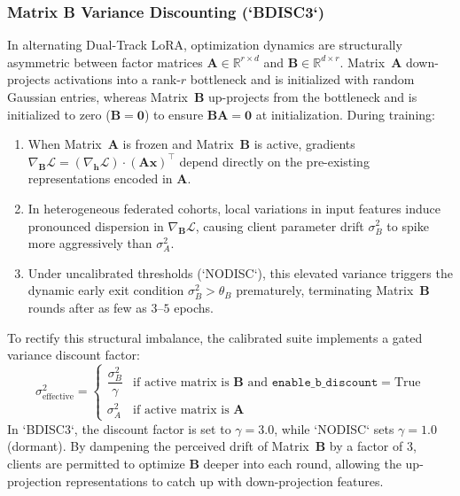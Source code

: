 \documentclass[10pt,a4paper]{article}
\begin{document}
\subsubsection{Matrix B Variance Discounting (`BDISC3`)}
In alternating Dual-Track LoRA, optimization dynamics are structurally asymmetric between factor matrices $\mathbf{A} \in \mathbb{R}^{r \times d}$ and $\mathbf{B} \in \mathbb{R}^{d \times r}$.
Matrix~$\mathbf{A}$ down-projects activations into a rank-$r$ bottleneck and is initialized with random Gaussian entries, whereas Matrix~$\mathbf{B}$ up-projects from the bottleneck and is initialized to zero ($\mathbf{B} = \mathbf{0}$) to ensure $\mathbf{B}\mathbf{A} = \mathbf{0}$ at initialization.
During training:
\begin{enumerate}
    \item When Matrix~$\mathbf{A}$ is frozen and Matrix~$\mathbf{B}$ is active, gradients $\nabla_\mathbf{B} \mathcal{L} = (\nabla_\mathbf{h} \mathcal{L}) \cdot (\mathbf{A}\mathbf{x})^\top$ depend directly on the pre-existing representations encoded in $\mathbf{A}$.
    \item In heterogeneous federated cohorts, local variations in input features induce pronounced dispersion in $\nabla_\mathbf{B} \mathcal{L}$, causing client parameter drift $\sigma^2_B$ to spike more aggressively than $\sigma^2_A$.
    \item Under uncalibrated thresholds (`NODISC`), this elevated variance triggers the dynamic early exit condition $\sigma^2_B > \theta_B$ prematurely, terminating Matrix~$\mathbf{B}$ rounds after as few as $3$--$5$ epochs.
\end{enumerate}
To rectify this structural imbalance, the calibrated suite implements a gated variance discount factor:
\begin{equation}
\sigma^2_{\text{effective}} = 
\begin{cases}
\dfrac{\sigma^2_B}{\gamma} & \text{if active matrix is } \mathbf{B} \text{ and } \texttt{enable\_b\_discount} = \text{True} \\[0.8em]
\sigma^2_A & \text{if active matrix is } \mathbf{A}
\end{cases}
\end{equation}
In `BDISC3`, the discount factor is set to $\gamma = 3.0$, while `NODISC` sets $\gamma = 1.0$ (dormant).
By dampening the perceived drift of Matrix~$\mathbf{B}$ by a factor of 3, clients are permitted to optimize $\mathbf{B}$ deeper into each round, allowing the up-projection representations to catch up with down-projection features.
\end{document}
